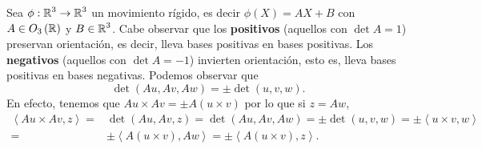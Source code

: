 Sea $\displaystyle \phi:\mathbb{R}^{3}\to \mathbb{R}^{3} $ un movimiento rígido, es decir $\displaystyle \phi\left(X\right)=AX + B $ con $\displaystyle A \in O_{3}\left(\mathbb{R}\right) $ y $\displaystyle B \in \mathbb{R}^{3} $. Cabe observar que los \textbf{positivos} (aquellos con $\displaystyle \det A=1 $) preservan orientación, es decir, lleva bases positivas en bases positivas. 
Los \textbf{negativos} (aquellos con $\displaystyle \det A = -1 $) invierten orientación, esto es, lleva bases positivas en bases negativas. Podemos observar que 
\[\det\left(Au, Av, Aw\right)=\pm \det\left(u,v,w\right) .\]
En efecto, tenemos que $\displaystyle A u \times A v = \pm A\left(u \times v\right) $ por lo que si $\displaystyle z = Aw $,
\[
\begin{split}
	\left\langle Au \times Av, z \right\rangle = &\det\left(Au, Av, z\right)=\det\left(Au, Av, Aw\right)=\pm \det\left(u,v,w\right)=\pm\left\langle u \times v, w \right\rangle \\
	= & \pm \left\langle A\left(u\times v\right), Aw \right\rangle =\pm \left\langle A\left(u \times v\right), z \right\rangle.
\end{split}
\]

